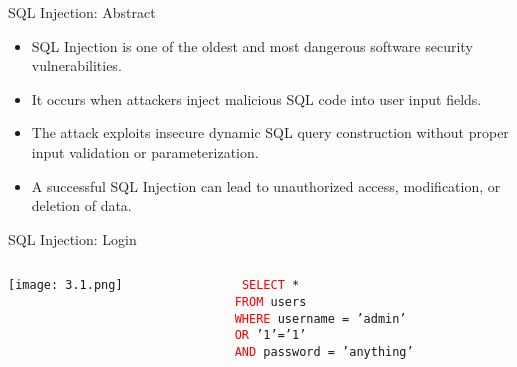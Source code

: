\documentclass[t,ignorenonframetext]{beamer}
\begin{document}
\begin{frame}{SQL Injection: Abstract}
\begin{itemize}
    \item SQL Injection is one of the oldest and most dangerous software security vulnerabilities.
    \item It occurs when attackers inject malicious SQL code into user input fields.
    \item The attack exploits insecure dynamic SQL query construction without proper input validation or parameterization.
    \item A successful SQL Injection can lead to unauthorized access, modification, or deletion of data.
\end{itemize}
\end{frame}


\begin{frame}[fragile]{SQL Injection: Login}

\begin{columns}[T] %
    \begin{column}{0.48\linewidth} %
        \texttt{[image: 3.1.png]}
    \end{column}
    
    \begin{column}{0.48\linewidth} %
        \texttt{%
        \newline
        \newline
        \newline
        \textcolor{red}{SELECT} * \\
        \textcolor{red}{FROM} users \\
        \textcolor{red}{WHERE} username = 'admin' \\
        \textcolor{red}{OR} '1'='1' \\
        \textcolor{red}{AND} password = 'anything'
        }
    \end{column}
\end{columns}

\end{frame}
\end{document}
